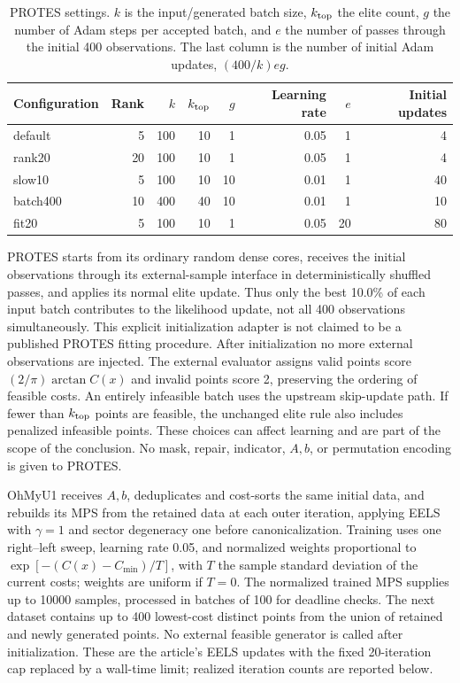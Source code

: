 \begin{table}[t]
\centering\small
\caption{PROTES settings. $k$ is the input/generated batch size, $k_{\rm top}$
the elite count, $g$ the number of Adam steps per accepted batch, and $e$
the number of passes through the initial 400 observations. The last column
is the number of initial Adam updates, $(400/k)eg$.}
\label{tab:protes_settings}
\begin{tabular}{lrrrrrrr}\toprule
Configuration & Rank & $k$ & $k_{\rm top}$ & $g$ & Learning rate & $e$ & Initial updates\\\midrule
default &5&100&10&1&0.05&1&4\\
rank20 &20&100&10&1&0.05&1&4\\
slow10 &5&100&10&10&0.01&1&40\\
batch400 &10&400&40&10&0.01&1&10\\
fit20 &5&100&10&1&0.05&20&80\\\bottomrule
\end{tabular}
\end{table}

PROTES starts from its ordinary random dense cores, receives the initial
observations through its external-sample interface in deterministically
shuffled passes, and applies its normal elite update. Thus only the best
10.0\% of each input batch contributes to the likelihood update, not all
400 observations simultaneously. This explicit initialization adapter is
not claimed to be a published PROTES fitting procedure. After initialization
no more external observations are injected. The external evaluator assigns
valid points score $(2/\pi)\arctan C(x)$ and invalid points score 2, preserving
the ordering of feasible costs. An entirely infeasible batch uses the
upstream skip-update path. If fewer than $k_{\rm top}$ points are feasible,
the unchanged elite rule also includes penalized infeasible points. These
choices can affect learning and are part of the scope of the conclusion.
No mask, repair, indicator, $A,b$, or permutation encoding is given to PROTES.

OhMyU1 receives $A,b$, deduplicates and cost-sorts the same initial data,
and rebuilds its MPS from the retained data at each outer iteration, applying
EELS with $\gamma=1$ and sector degeneracy one before canonicalization.
Training uses one right--left sweep, learning rate 0.05, and normalized
weights proportional to $\exp[-(C(x)-C_{\min})/T]$, with $T$ the sample
standard deviation of the current costs; weights are uniform if $T=0$.
The normalized trained MPS supplies up to 10000 samples, processed in batches
of 100 for deadline checks. The next dataset contains up to 400 lowest-cost
distinct points from the union of retained and newly generated points.
No external feasible generator is called after initialization. These are
the article's EELS updates with the fixed 20-iteration cap replaced by a
wall-time limit; realized iteration counts are reported below.

